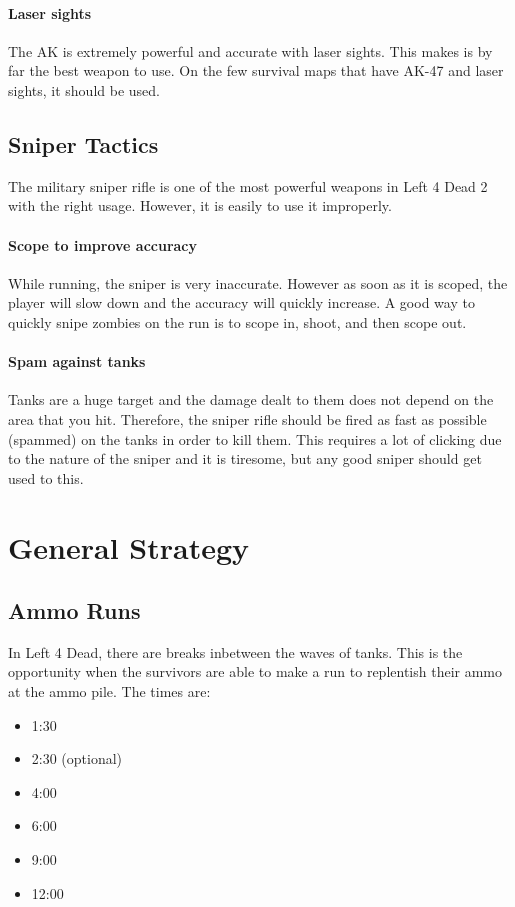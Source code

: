 \paragraph{Laser sights}
The AK is extremely powerful and accurate with laser sights. This makes is by far the best weapon to use. On the few survival maps that have AK-47 and laser sights, it should be used.

\subsection{Sniper Tactics}
The military sniper rifle is one of the most powerful weapons in Left 4 Dead 2 with the right usage. However, it is easily to use it improperly.

\paragraph{Scope to improve accuracy}
While running, the sniper is very inaccurate. However as soon as it is scoped, the player will slow down and the accuracy will quickly increase. A good way to quickly snipe zombies on the run is to scope in, shoot, and then scope out.

\paragraph{Spam against tanks}
Tanks are a huge target and the damage dealt to them does not depend on the area that you hit. Therefore, the sniper rifle should be fired as fast as possible (spammed) on the tanks in order to kill them. This requires a lot of clicking due to the nature of the sniper and it is tiresome, but any good sniper should get used to this.

\section{General Strategy}

\subsection{Ammo Runs}
In Left 4 Dead, there are breaks inbetween the waves of tanks. This is the opportunity when the survivors are able to make a run to replentish their ammo at the ammo pile. The times are:
\begin{itemize}
\item 1:30
\item 2:30 (optional)
\item 4:00
\item 6:00
\item 9:00
\item 12:00
\end{itemize}

